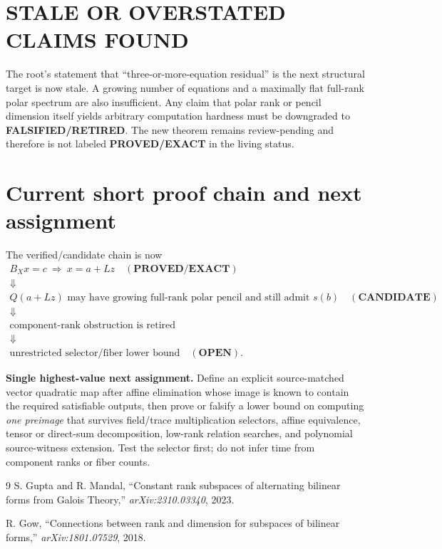 \documentclass[11pt]{article}
\newcommand{\EXACT}{\textbf{PROVED/EXACT}}
\newcommand{\CAND}{\textbf{CANDIDATE}}
\newcommand{\OPEN}{\textbf{OPEN}}
\newcommand{\RET}{\textbf{FALSIFIED/RETIRED}}
\begin{document}
\section{STALE OR OVERSTATED CLAIMS FOUND}
The root's statement that ``three-or-more-equation residual'' is the next
structural target is now stale.  A growing number of equations and a maximally
flat full-rank polar spectrum are also insufficient.  Any claim that polar
rank or pencil dimension itself yields arbitrary computation hardness must be
downgraded to \RET{}.  The new theorem remains review-pending and therefore
is not labeled \EXACT{} in the living status.

\section{Current short proof chain and next assignment}
The verified/candidate chain is now
\[
\begin{array}{c}
B_Xx=c\ \Longrightarrow\ x=a+Lz\quad(\EXACT)\\
\Downarrow\\
Q(a+Lz)\text{ may have growing full-rank polar pencil and still admit }s(b)
\quad(\CAND)\\
\Downarrow\\
\text{component-rank obstruction is retired}\\
\Downarrow\\
\text{unrestricted selector/fiber lower bound}\quad(\OPEN).
\end{array}
\]

\textbf{Single highest-value next assignment.}
Define an explicit source-matched vector quadratic map after affine
elimination whose image is known to contain the required satisfiable outputs,
then prove or falsify a lower bound on computing \emph{one preimage} that
survives field/trace multiplication selectors, affine equivalence, tensor or
direct-sum decomposition, low-rank relation searches, and polynomial
source-witness extension.  Test the selector first; do not infer time from
component ranks or fiber counts.

\begin{thebibliography}{9}
S. Gupta and R. Mandal,
``Constant rank subspaces of alternating bilinear forms from Galois Theory,''
\emph{arXiv:2310.03340}, 2023.

R. Gow,
``Connections between rank and dimension for subspaces of bilinear forms,''
\emph{arXiv:1801.07529}, 2018.
\end{thebibliography}
\end{document}
